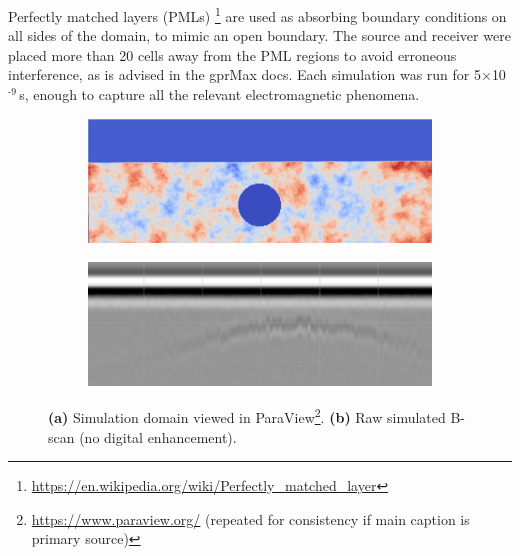             \noindent Perfectly matched layers (PMLs) \footnote{\url{https://en.wikipedia.org/wiki/Perfectly_matched_layer}} are used as absorbing boundary conditions on all sides of the domain, to mimic an open boundary. The source and receiver were placed more than 20 cells away from the PML regions to avoid erroneous interference, as is advised in the gprMax docs. Each simulation was run for 5$\times$10$^{\text{-9}}$\,s, enough to capture all the relevant electromagnetic phenomena.
            \begin{figure}[htbp]
            \centering
            \begin{subfigure}[b]{0.48\textwidth}
                \centering
                \includegraphics[width=\textwidth]{figs/Rory/radar_domain.pdf}
                \caption{ } 
                \label{fig:radar_domain_sub} %
            \end{subfigure}
            \hfill
            \begin{subfigure}[b]{0.48\textwidth}
                \centering
                \includegraphics[width=\textwidth]{figs/Rory/sim_bscan_cropped.png}
                \caption{ }
                \label{fig:original_bscan_sub} %
            \end{subfigure}
            
            \caption[Simulation Domain and Raw B-scan Overview]{%
              \textbf{(a)} Simulation domain viewed in ParaView\footnote{\url{https://www.paraview.org/} (repeated for consistency if main caption is primary source)}.
              \textbf{(b)} Raw simulated B-scan (no digital enhancement).
            }
            \label{fig:domain_and_bscan_overview} %
        \end{figure}   
    
